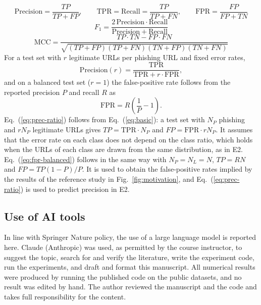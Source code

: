 \documentclass[pdflatex,sn-mathphys-num]{sn-jnl}%
\theoremstyle{thmstyleone}%
\theoremstyle{thmstyletwo}%
\theoremstyle{thmstylethree}%
\begin{document}
\begin{equation}
\mathrm{Precision} = \frac{TP}{TP+FP}, \qquad
\mathrm{TPR} = \mathrm{Recall} = \frac{TP}{TP+FN}, \qquad
\mathrm{FPR} = \frac{FP}{FP+TN}\label{eq:basic}
\end{equation}
\begin{equation}
F_1 = \frac{2\,\mathrm{Precision}\cdot\mathrm{Recall}}{\mathrm{Precision}+\mathrm{Recall}}\label{eq:f1}
\end{equation}
\begin{equation}
\mathrm{MCC} = \frac{TP\cdot TN - FP\cdot FN}{\sqrt{(TP+FP)(TP+FN)(TN+FP)(TN+FN)}}\label{eq:mcc}
\end{equation}
For a test set with $r$ legitimate URLs per phishing URL and fixed error rates,
\begin{equation}
\mathrm{Precision}(r) = \frac{\mathrm{TPR}}{\mathrm{TPR} + r\cdot\mathrm{FPR}},\label{eq:prec-ratio}
\end{equation}
and on a balanced test set ($r=1$) the false-positive rate follows from the reported precision $P$ and recall $R$ as
\begin{equation}
\mathrm{FPR} = R\left(\frac{1}{P}-1\right).\label{eq:fpr-balanced}
\end{equation}
Eq.~(\ref{eq:prec-ratio}) follows from Eq.~(\ref{eq:basic}): a test set with $N_P$ phishing and $rN_P$ legitimate URLs gives $TP=\mathrm{TPR}\cdot N_P$ and $FP=\mathrm{FPR}\cdot rN_P$. It assumes that the error rate on each class does not depend on the class ratio, which holds when the URLs of each class are drawn from the same distribution, as in E2. Eq.~(\ref{eq:fpr-balanced}) follows in the same way with $N_P=N_L=N$, $TP=RN$ and $FP=TP(1-P)/P$. It is used to obtain the false-positive rates implied by the results of the reference study in Fig.~\ref{fig:motivation}, and Eq.~(\ref{eq:prec-ratio}) is used to predict precision in E2.

\subsection{Use of AI tools}\label{subsec3-8}

In line with Springer Nature policy, the use of a large language model is reported here. Claude (Anthropic) was used, as permitted by the course instructor, to suggest the topic, search for and verify the literature, write the experiment code, run the experiments, and draft and format this manuscript. All numerical results were produced by running the published code on the public datasets, and no result was edited by hand. The author reviewed the manuscript and the code and takes full responsibility for the content.
\end{document}
